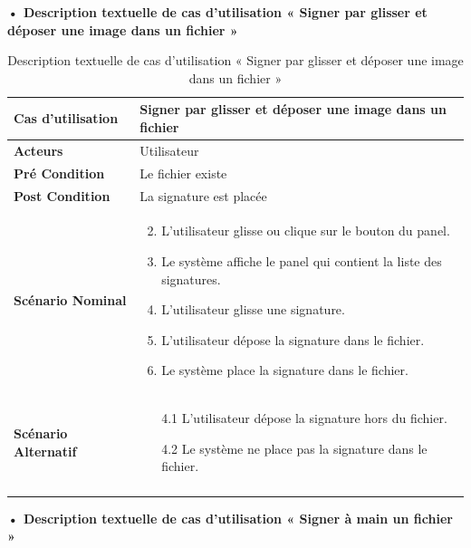 \textbf{•	Description textuelle de cas d'utilisation « Signer par glisser et déposer une image dans un fichier »}

\begin{longtable}{|p{5cm}|p{10cm}|}
\hline
\textbf{Cas d'utilisation}&Signer par glisser et déposer une image dans un fichier\\
\hline
\textbf{Acteurs}&Utilisateur\\
\hline
\textbf{Pré Condition}&Le fichier existe\\
\hline
\textbf{Post Condition}&La signature est placée\\
\hline
\textbf{Scénario Nominal}&
\vspace{-\baselineskip}
\begin{enumerate}
    \setcounter{enumi}{1}
    \item L'utilisateur glisse ou clique sur le bouton du panel.
    \item Le système affiche le panel qui contient la liste des signatures.
    \item L'utilisateur glisse une signature.
    \item L'utilisateur dépose la signature dans le fichier.
    \item Le système place la signature dans le fichier.
\end{enumerate}\\
\hline
\textbf{Scénario Alternatif}&
\vspace{-\baselineskip}
\begin{enumerate}
    \item [4.1] L'utilisateur dépose la signature hors du fichier.
    \item [4.2] Le système ne place pas la signature dans le fichier.
\end{enumerate}\\
\hline
\caption{Description textuelle de cas d'utilisation « Signer par glisser et déposer une image dans un fichier »}
\label{tab:description-textuelle-de-cas-d-utilisation-signer-par-glisser-et-deposer-une-image-dans-un-fichier}
\end{longtable}

\textbf{•	Description textuelle de cas d'utilisation « Signer à main un fichier »}

